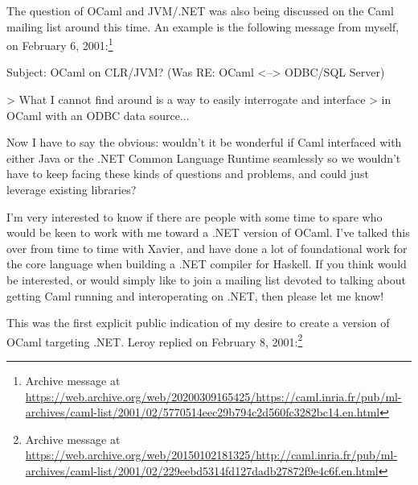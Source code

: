 \documentclass[acmsmall]{acmart}\settopmatter{}
\begin{document}
The question of OCaml and JVM/.NET was also being discussed on the Caml mailing list around this time.  An example is the following message from
myself, on February 6, 2001:\footnote{ Archive message at \url{https://web.archive.org/web/20200309165425/https://caml.inria.fr/pub/ml-archives/caml-list/2001/02/5770514eec29b794c2d560fc3282bc14.en.html}}
\begin{verbquote}
Subject: OCaml on CLR/JVM? (Was RE: OCaml <--> ODBC/SQL Server)

> What I cannot find around is a way to easily interrogate and interface 
> in OCaml with an ODBC data source...

Now I have to say the obvious: wouldn't it be wonderful if Caml interfaced with either Java or the .NET Common Language Runtime seamlessly so we wouldn't have to keep facing these kinds of questions and problems, and could just leverage existing libraries?   

I'm very interested to know if there are people with some time to spare who would be keen to work with me toward a .NET version of OCaml.  I've talked this over from time to time with Xavier, and have done a lot of foundational work for the core language when building a .NET compiler for Haskell.  If you think would be interested, or would simply like to join a mailing list devoted to talking about getting Caml running and interoperating on .NET, then please let me know!
\end{verbquote}
This was the first explicit public indication of my desire to create a version of OCaml targeting .NET. Leroy replied on February 8, 2001:\footnote{ Archive message at \url{https://web.archive.org/web/20150102181325/http://caml.inria.fr/pub/ml-archives/caml-list/2001/02/229eebd5314fd127dadb27872f9e4c6f.en.html}}
\end{document}
